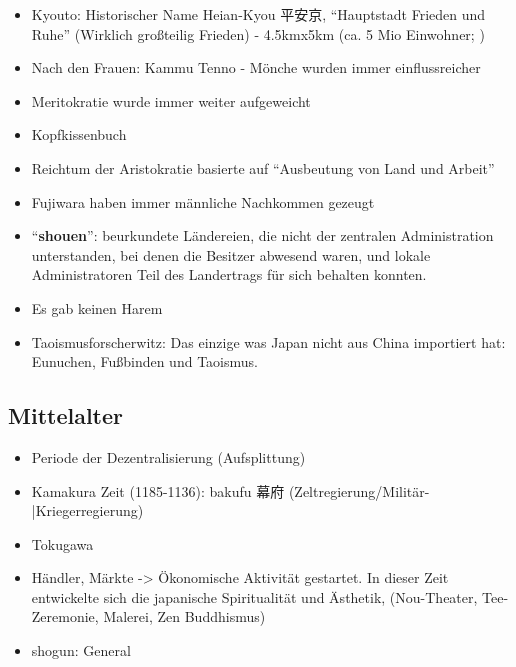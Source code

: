 \documentclass[emulatestandardclasses]{scrartcl}
\begin{document}
\begin{itemize}
  \item Kyouto: Historischer Name Heian-Kyou 平安京, "`Hauptstadt Frieden und Ruhe"' (Wirklich großteilig Frieden) - 4.5kmx5km (ca. 5 Mio Einwohner; )
  \item Nach den Frauen: Kammu Tenno - Mönche wurden immer einflussreicher
  \item Meritokratie wurde immer weiter aufgeweicht
  \item Kopfkissenbuch
  \item Reichtum der Aristokratie basierte auf "`Ausbeutung von Land und Arbeit"'
  \item Fujiwara haben immer männliche Nachkommen gezeugt
  \item "`\textbf{shouen}"': beurkundete Ländereien, die nicht der zentralen Administration unterstanden, bei denen die Besitzer abwesend waren, und lokale Administratoren Teil des Landertrags für sich behalten konnten.
  \item Es gab keinen Harem
  \item Taoismusforscherwitz: Das einzige was Japan nicht aus China importiert hat: Eunuchen, Fußbinden und Taoismus.
\end{itemize}

\subsection{Mittelalter}

\begin{itemize}
  \item Periode der Dezentralisierung (Aufsplittung)
  \item Kamakura Zeit (1185-1136): bakufu 幕府 (Zeltregierung/Militär-|Kriegerregierung)
  \item Tokugawa 
  \item Händler, Märkte -> Ökonomische Aktivität gestartet. In dieser Zeit entwickelte sich die japanische Spiritualität und Ästhetik, (Nou-Theater, Tee-Zeremonie, Malerei, Zen Buddhismus)
  \item shogun: General
\end{itemize}

\newpage
\end{document}
